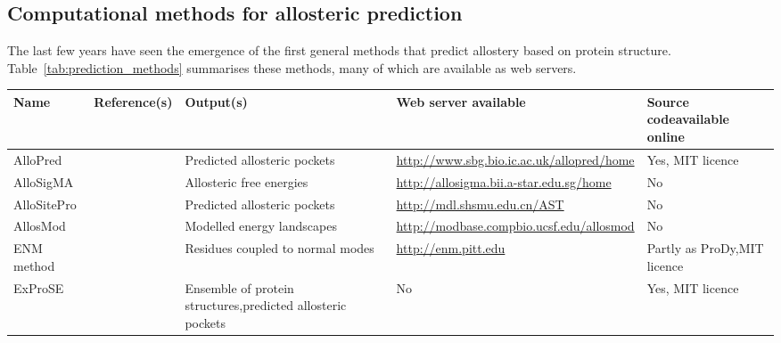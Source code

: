 \subsection{Computational methods for allosteric prediction}

The last few years have seen the emergence of the first general methods that predict allostery based on protein structure.
Table~\ref{tab:prediction_methods} summarises these methods, many of which are available as web servers.


\begin{table}
\centering

\begin{footnotesize}
\begin{tabular}{ l l p{5cm} l p{3cm} }
\hline
\textbf{Name} & \textbf{Reference(s)}                   & \textbf{Output(s)}                                                             & \textbf{Web server available}                   & \textbf{Source code\newline available online} \\
\hline
AlloPred      & \cite{Greener2015}                      & Predicted allosteric pockets                                                   & \url{http://www.sbg.bio.ic.ac.uk/allopred/home} & Yes, MIT licence                              \\
AlloSigMA     & \cite{Guarnera2017}                     & Allosteric free energies                                                       & \url{http://allosigma.bii.a-star.edu.sg/home}   & No                                            \\
AlloSitePro   & \cite{Song2017, Huang2013}              & Predicted allosteric pockets                                                   & \url{http://mdl.shsmu.edu.cn/AST}               & No                                            \\
AllosMod      & \cite{Weinkam2012}                      & Modelled energy landscapes                                                     & \url{http://modbase.compbio.ucsf.edu/allosmod}  & No                                            \\
ENM method    & \cite{Li2017}                           & Residues coupled to normal modes                                               & \url{http://enm.pitt.edu}                       & Partly as ProDy,\newline MIT licence          \\
ExProSE       & \cite{Greener2017}                      & Ensemble of protein structures,\newline predicted allosteric pockets           & No                                              & Yes, MIT licence                              \\

\end{tabular}
\end{footnotesize}
\end{table}
